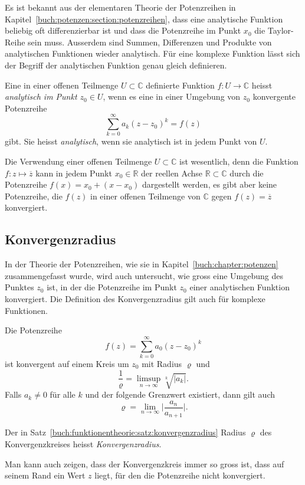 Es ist bekannt aus der elementaren Theorie der Potenzreihen
in Kapitel~\ref{buch:potenzen:section:potenzreihen}, dass
eine analytische Funktion beliebig oft differenzierbar ist und dass
die Potenzreihe im Punkt $x_0$ die Taylor-Reihe sein muss.
Ausserdem sind Summen, Differenzen und Produkte von analytischen Funktionen
wieder analytisch.
Für eine komplexe Funktion lässt sich der Begriff der
analytischen Funktion genau gleich definieren.

\begin{definition}
Eine in einer offenen Teilmenge $U\subset \mathbb{C}$ definierte Funktion
$f\colon U\to\mathbb{C}$ heisst {\em analytisch im Punkt $z_0\in U$}, wenn
%
es eine in einer Umgebung von $z_0$ konvergente Potenzreihe
\[
\sum_{k=0}^\infty a_k(z-z_0)^k = f(z)
\]
gibt.
Sie heisst {\em analytisch}, wenn sie analytisch ist in jedem Punkt von $U$.
%
\end{definition}

Die Verwendung einer offenen Teilmenge $U\subset\mathbb{C}$ ist wesentlich,
denn die Funktion $f\colon z\mapsto \overline{z}$ kann in jedem Punkt
$x_0\in\mathbb{R}$
der reellen Achse $\mathbb{R}\subset\mathbb{C}$ durch die Potenzreihe 
$f(x) = x_0 + (x-x_0)$ dargestellt werden,
es gibt aber keine Potenzreihe, die $f(z)$ in einer offenen Teilmenge
von $\mathbb{C}$ gegen $f(z)=\overline{z}$ konvergiert.

%
%
\subsection{Konvergenzradius
\label{buch:funktionentheorie:subsection:konvergenzradius}}
In der Theorie der Potenzreihen, wie sie in Kapitel~\ref{buch:chapter:potenzen}
zusammengefasst wurde, wird auch untersucht, wie gross
eine Umgebung des Punktes $z_0$ ist, in der die Potenzreihe
im Punkt $z_0$ einer analytischen Funktion konvergiert.
Die Definition des Konvergenzradius gilt auch für komplexe Funktionen.

\begin{satz}
%
\label{buch:funktionentheorie:satz:konvergenzradius}
Die Potenzreihe
\[
f(z) = \sum_{k=0}^\infty a_0(z-z_0)^k
\]
ist konvergent auf einem Kreis um $z_0$ mit Radius $\varrho$ und
\[
\frac{1}{\varrho}
=
\limsup_{n\to\infty} \sqrt[k]{|a_k|}.
\]
Falls $a_k\ne 0$ für alle $k$ und der folgende Grenzwert existiert,
dann gilt auch
\[
\varrho = \lim_{n\to\infty} \biggl| \frac{a_n}{a_{n+1}}\biggr|.
\]
\end{satz}

\begin{definition}
\label{buch:funktionentheorie:definition:konvergenzradius}
%
%
Der in Satz~\ref{buch:funktionentheorie:satz:konvergenzradius}
Radius $\varrho$ des Konvergenzkreises heisst {\em Konvergenzradius}.
\end{definition}

Man kann auch zeigen, dass der Konvergenzkreis immer so gross ist,
dass auf seinem Rand ein Wert $z$ liegt, für den die Potenzreihe nicht
konvergiert.

